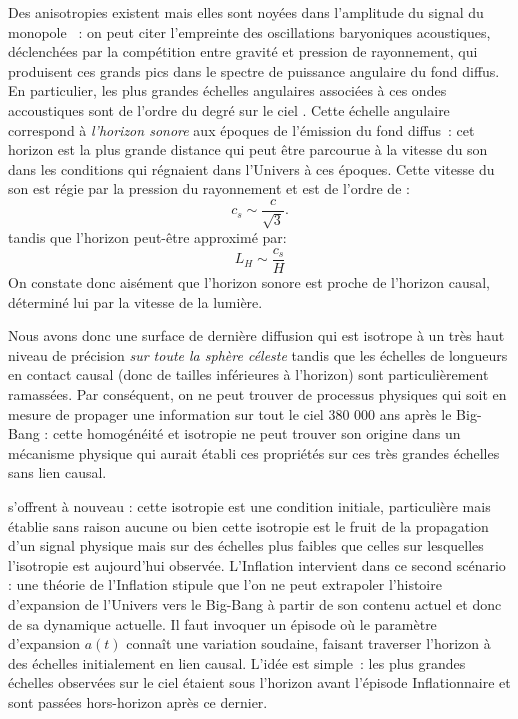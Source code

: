 Des anisotropies existent mais elles sont noyées dans l'amplitude du signal du monopole~ : on peut citer l'empreinte des oscillations baryoniques acoustiques, déclenchées par la compétition entre gravité et pression de rayonnement, qui produisent ces grands pics dans le spectre de puissance angulaire du fond diffus. En particulier, les plus grandes échelles angulaires associées à ces ondes accoustiques  sont de l'ordre du degré sur le ciel . Cette échelle angulaire correspond à \textit{l'horizon sonore} aux époques de l'émission du fond diffus~: cet horizon est la plus grande distance qui peut être parcourue à la vitesse du son dans les conditions qui régnaient dans l'Univers à ces époques. Cette vitesse du son est régie par la pression du rayonnement et est de l'ordre de :
\begin{equation}
c_s\sim \frac{c}{\sqrt 3}.
\end{equation}
tandis que l'horizon peut-être approximé par:
\begin{equation}
L_H\sim\frac{c_s}{H}
\end{equation}
On constate donc aisément que l'horizon sonore est proche de l'horizon causal, déterminé lui par la vitesse de la lumière.

Nous avons donc une surface de dernière diffusion qui est isotrope à un très haut niveau de précision \textit{sur toute la sphère céleste} tandis que les échelles de longueurs en contact causal (donc de tailles inférieures à l'horizon) sont particulièrement ramassées. Par conséquent, on ne peut trouver de processus physiques qui soit en mesure de propager une information sur tout le ciel 380 000 ans après le Big-Bang : cette homogénéité et isotropie ne peut trouver son origine dans un mécanisme physique qui aurait établi ces propriétés sur ces très grandes échelles sans lien causal.

 s'offrent à nouveau : cette isotropie est une condition initiale, particulière mais établie sans raison aucune ou bien cette isotropie est le fruit de la propagation d'un signal physique mais sur des échelles plus faibles que celles sur lesquelles l'isotropie est aujourd'hui observée. L'Inflation intervient dans ce second scénario : une théorie de l'Inflation stipule que l'on ne peut extrapoler l'histoire d'expansion de l'Univers vers le Big-Bang à partir de son contenu actuel et donc de sa dynamique actuelle. Il faut invoquer un épisode où le paramètre d'expansion $a(t)$ connaît une variation soudaine, faisant traverser l'horizon à des échelles initialement en lien causal. L'idée est simple~: les plus grandes échelles observées sur le ciel étaient sous l'horizon avant l'épisode Inflationnaire et sont passées hors-horizon après ce dernier. 

